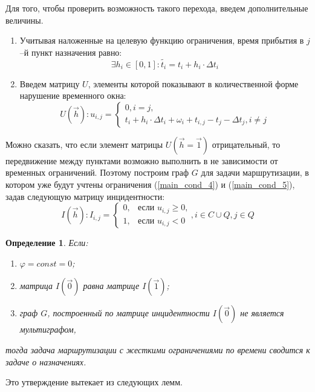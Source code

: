 \documentclass[]{TAACpaper}
\begin{document}
Для того, чтобы проверить возможность такого перехода, введем дополнительные величины. 
\begin{enumerate}
\item Учитывая наложенные на целевую функцию ограничения, время прибытия в $j$–й пункт назначения равно:
\begin{equation} \label{t_j_input}
   \exists h_i \in [0,1] : \tilde{t_i} = t_i + h_i \cdot \Delta t_i
\end{equation}

\item Введем матрицу $U$, элементы которой показывают в количественной форме нарушение временного окна:
\begin{equation} \label{matrix_U}
 U(\vec{h}) : u_{i,j} = 
    \begin{cases}
	  0, i=j, \\
      t_i + h_i \cdot \Delta t_i + \omega_i + t_{i,j} - t_j - \Delta t_j, i \neq j
    \end{cases}   
\end{equation}
\end{enumerate}

Можно сказать, что если элемент матрицы $U(\vec{h}=\vec{1})$ отрицательный, то передвижение между пунктами возможно выполнить в не зависимости от временных ограничений. Поэтому построим граф $G$ для задачи маршрутизации, в котором уже будут учтены ограничения (\ref{main_cond_4}) и (\ref{main_cond_5}), задав следующую матрицу инцидентности:
\begin{equation} \label{matrix_I}
 I(\vec{h}) : I_{i,j} = 
    \begin{cases}
	  0, &\text{если $u_{i,j} \geq 0$,} \\
      1, &\text{если $u_{i,j}<0$}
    \end{cases}, i \in C \cup Q, j \in Q
\end{equation}
\newtheorem{Def}{Определение} 
\begin{Def}\label{def_main}
Если:
  \begin{enumerate}
  \item $\varphi=const=0$;
  \item матрица $I(\vec{0})$ равна матрице $I(\vec{1})$;
  \item граф $G$, построенный по матрице инцидентности $I(\vec{0})$ не является мультиграфом,
  \end{enumerate}
 тогда задача маршрутизации с жесткими ограничениями по времени сводится к задаче о назначениях.
\end{Def}
Это утверждение вытекает из следующих лемм.
\end{document}
